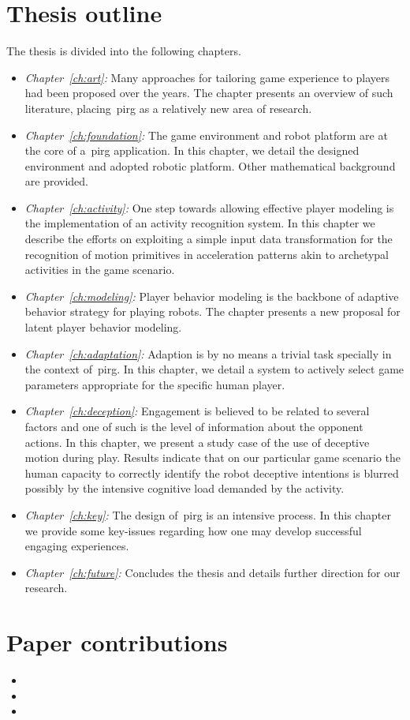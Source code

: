 \section{Thesis outline}
The thesis is divided into the following chapters.

\begin{itemize}
\item\emph{Chapter~\ref{ch:art}:} Many approaches for tailoring %
game experience to players had been proposed over the years. The chapter presents an overview of such literature, placing~\gls{pirg} as a relatively new area of research.
\item\emph{Chapter~\ref{ch:foundation}:} The game environment and robot platform are at the core of a~\gls{pirg} application. In this chapter, we detail the designed environment and adopted robotic platform. Other mathematical background are provided.%
\item\emph{Chapter~\ref{ch:activity}:} One step towards allowing effective player modeling is the implementation of an activity recognition system. In this chapter we describe the efforts on exploiting a simple input data transformation for the recognition of motion primitives in acceleration patterns akin to archetypal activities in the game scenario.
\item\emph{Chapter~\ref{ch:modeling}:} Player behavior modeling is the backbone of adaptive behavior strategy for playing robots. The chapter presents a new proposal for latent player behavior modeling.
\item\emph{Chapter~\ref{ch:adaptation}:} Adaption is by no means a trivial task specially in the context of~\gls{pirg}. In this chapter, we detail a system to actively select game parameters appropriate for the specific human player.
\item\emph{Chapter~\ref{ch:deception}:} Engagement is believed to be related to several factors and one of such is the level of information about the opponent actions. In this chapter, we present a study case of the use of deceptive motion during play. Results indicate that on our particular game scenario the human capacity to correctly identify the robot deceptive intentions is blurred possibly by the intensive cognitive load demanded by the activity.
\item\emph{Chapter~\ref{ch:key}:} The design of~\gls{pirg} is an intensive process. In this chapter we provide some key-issues regarding how one may develop successful engaging experiences.
\item\emph{Chapter~\ref{ch:future}:} Concludes the thesis and details further direction for our research.
\end{itemize}

\section{Paper contributions}
\begin{itemize}
\item {}
\item {}
\item {}
\end{itemize}
